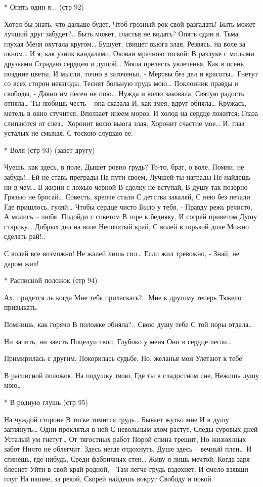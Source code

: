 * Опять один я... (стр 92)

Хотел бы знать, что дальше будет,
Чтоб грозный рок свой разгадать!
Быть может лучший друг забудет?..
Быть может, счастья не видать?
Опять один я. Тьма глухая
Меня окутала кругом…
Бушует, свищет вьюга злая,
Резвясь, на воле за окном…
И я, как узник кандалами,
Окован мрачною тоской:
В разлуке с милыми друзьями
Страдаю сердцем и душой…
Увяла прелесть увлеченья,
Как в осень поздние цветы,
И мысли, точно в заточеньи, -
Мертвы без дел и красоты…
Гнетут со всех сторон невзгоды,
Теснят больную грудь мою…
Поклонник правды и свободы, -
Давно им песен не пою…
Нужда и волю заковала,
Святую радость отняла…
Ты любишь честь – она сказала
И, как змея, вдруг обняла…
Кружась, метель в окно стучится,
Вползает инеем мороз,
И холод на сердце ложится;
Глаза слипаются от слез…
Хоронит волю вьюга злая,
Хоронит счастие мое…
И, глаз усталых не смыкая,
С тоскою слушаю ее.


* Воля (стр 93)
(завет другу)

Чуешь, как здесь, в поле,
Дышет ровно грудь?
То-то, брат, о воле,
Помни, не забудь!..
Ей не ставь преграды
На пути своем,
Лучшей ты награды
Не найдешь ни в чем…
В жизни с ложью черной
В сделку не вступай,
В душу так позорно
Грязью не бросай…
Совесть, крепче стали
С детства закаляй,
С нею без печали
Где пришлось, гуляй…
Чтобы сердце чисто
Было у тебя, -
Правду режь речисто,
А молись – любя.
Подойди с советом
В горе к бедняку,
И согрей приветом
Душу старику…
Добрых дел на воле
Непочатый край,
С волей в горькой доле
Можно сделать рай!..

С волей все возможно!
Не жалей лишь сил…
Если жил тревожно, -
Знай, не даром жил!


* Расписной положок (стр 94)

Ах, придется ль когда
Мне тебя приласкать?..
Мне к другому теперь
Тяжело привыкать.

Помнишь,  как горячо
В положке обняла?..
Свою душу тебе
С той поры отдала…

Ни запить, ни заесть
Поцелуи твои,
Глубоко у меня
Они в сердце легли…

Примирилась с другим,
Покорилась судьбе,
Но, желанья мои
Улетают к тебе!

В расписной положок,
На подушку твою,
Где ты в сладостном сне,
Нежишь душу мою…


* В родную глушь (стр 95)

На чуждой стороне
В тоске томится грудь…
Бывает жутко мне
И в душу заглянуть…
Одни проклятья в ней
С невольным злом растут,
Следы суровых дней
Усталый ум гнетут…
От тягостных работ
Порой спина трещит,
Но жизненных забот
Ничто не облегчит.
Здесь негде отдохнуть,
Душе здесь – вечный плен…
И сгинешь, где-нибудь,
Среди фабричных стен…
Живу я лишь мечтой:
Когда заря блеснет
Уйти в свой край родной, -
Там легче грудь вздохнет.
И смело взявши плуг
На пашне, за рекой,
Скорей найдешь вокруг
Свободу и покой.


